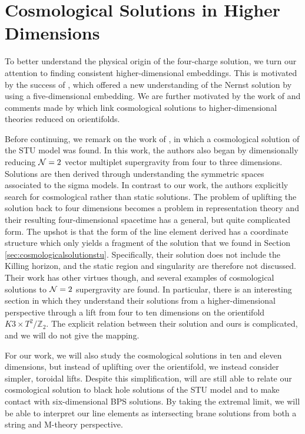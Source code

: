 \chapter{Cosmological Solutions in Higher Dimensions}
\label{ch:brane}


To better understand the physical origin of the four-charge solution, we turn our attention to finding consistent higher-dimensional embeddings. This is motivated by the success of \cite{Dempster:2016}, which offered a new understanding of the Nernst solution \cite{Dempster:2015} by using a five-dimensional embedding. We are further motivated by the work of \cite{Cornalba:2003kd} and comments made by \cite{Burgess:2002vu} which link cosmological solutions to higher-dimensional theories reduced on orientifolds.

Before continuing, we remark on the work of \cite{Fre:2008zd}, in which a cosmological solution of the STU model was found. In this work, the authors also began by dimensionally reducing ${\cal N} = 2$ vector multiplet supergravity from four to three dimensions. Solutions are then derived through understanding the symmetric spaces associated to the sigma models. In contrast to our work, the authors explicitly search for cosmological rather than static solutions. The problem of uplifting the solution back to four dimensions becomes a problem in representation theory and their resulting four-dimensional spacetime has a general, but quite complicated form. The upshot is that the form of the line element derived has a coordinate structure which only yields a fragment of the solution that we found in Section \ref{sec:cosmologicalsolutionstu}. Specifically, their solution does not include the Killing horizon, and the static region and singularity are therefore not discussed. Their work has other virtues though, and several examples of cosmological solutions to ${\cal N} = 2$ supergravity are found. In particular, there is an interesting section in which they understand their solutions from a higher-dimensional perspective through a lift from four to ten dimensions on the orientifold $K3 \times T^2 / \mathbb{Z}_2$. The explicit relation between their solution and ours is complicated, and we will do not give the mapping. 

For our work, we will also study the cosmological solutions in ten and eleven dimensions, but instead of uplifting over the orientifold, we instead consider simpler, toroidal lifts. Despite this simplification, will are still able to relate our cosmological solution to black hole solutions of the STU model and to make contact with six-dimensional BPS solutions. By taking the extremal limit, we will be able to interpret our line elements as intersecting brane solutions from both a string and M-theory perspective.

